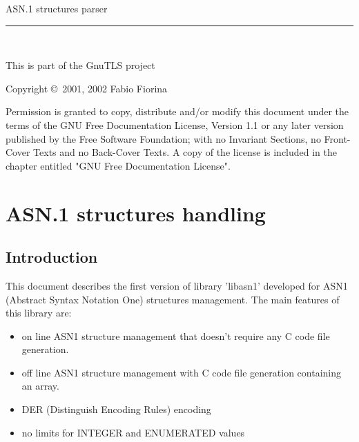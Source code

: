 \documentclass{book}
\newcommand{\HRule}{\rule{\linewidth}{0.4mm}}
\begin{document}
{\Large{ASN.1 structures parser}}
\vspace{-.3cm}
\\
\HRule
\vspace{-.6cm}
\\
\begin{flushright}
This is part of the GnuTLS project\\
\end{flushright}


\begin{center}
\par
Copyright \copyright\ 2001, 2002 Fabio Fiorina\\
\setlength{\parskip}{4mm}
\par
Permission is granted to copy, distribute and/or modify this
document under the terms of the GNU Free Documentation License,
Version 1.1 or any later version published by the Free Software
Foundation; with no Invariant Sections, no Front-Cover Texts and
no Back-Cover Texts.  A copy of the license is included in the
chapter entitled "GNU Free Documentation License".
\end{center}

\setlength{\parindent}{2mm}

\setlength{\parskip}{1mm}

\tableofcontents

\chapter{ASN.1 structures handling}

\section{Introduction}
 This document describes the first version of library 'libasn1' developed
for ASN1 (Abstract Syntax Notation One) structures management.
The main features of this library are:
\begin{itemize}
\item on line ASN1 structure management that doesn't require any
C code file generation.
\item off line ASN1 structure management with C code file generation 
containing an array.
\item DER (Distinguish Encoding Rules) encoding
\item no limits for INTEGER and ENUMERATED values  
\end{itemize}
\end{document}
